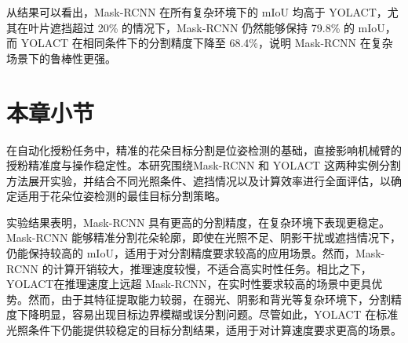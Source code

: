 从结果可以看出，Mask-RCNN 在所有复杂环境下的 mIoU 均高于 YOLACT，尤其在叶片遮挡超过 20\% 的情况下，Mask-RCNN 仍然能够保持 79.8\% 的 mIoU，而 YOLACT 在相同条件下的分割精度下降至 68.4\%，说明 Mask-RCNN 在复杂场景下的鲁棒性更强。
\section{本章小节}
在自动化授粉任务中，精准的花朵目标分割是位姿检测的基础，直接影响机械臂的授粉精准度与操作稳定性。本研究围绕Mask-RCNN 和 YOLACT 这两种实例分割方法展开实验，并结合不同光照条件、遮挡情况以及计算效率进行全面评估，以确定适用于花朵位姿检测的最佳目标分割策略。

实验结果表明，Mask-RCNN 具有更高的分割精度，在复杂环境下表现更稳定。Mask-RCNN 能够精准分割花朵轮廓，即使在光照不足、阴影干扰或遮挡情况下，仍能保持较高的 mIoU，适用于对分割精度要求较高的应用场景。然而，Mask-RCNN 的计算开销较大，推理速度较慢，不适合高实时性任务。相比之下，YOLACT在推理速度上远超 Mask-RCNN，在实时性要求较高的场景中更具优势。然而，由于其特征提取能力较弱，在弱光、阴影和背光等复杂环境下，分割精度下降明显，容易出现目标边界模糊或误分割问题。尽管如此，YOLACT 在标准光照条件下仍能提供较稳定的目标分割结果，适用于对计算速度要求更高的场景。